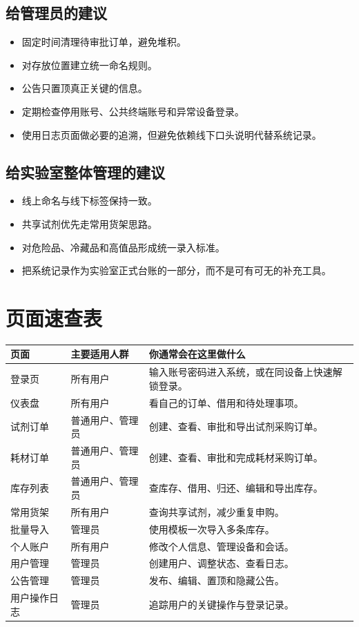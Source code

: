 \documentclass[12pt,a4paper]{ctexart}
\begin{document}
\subsection{给管理员的建议}
\begin{itemize}
  \item 固定时间清理待审批订单，避免堆积。
  \item 对存放位置建立统一命名规则。
  \item 公告只置顶真正关键的信息。
  \item 定期检查停用账号、公共终端账号和异常设备登录。
  \item 使用日志页面做必要的追溯，但避免依赖线下口头说明代替系统记录。
\end{itemize}

\subsection{给实验室整体管理的建议}
\begin{itemize}
  \item 线上命名与线下标签保持一致。
  \item 共享试剂优先走常用货架思路。
  \item 对危险品、冷藏品和高值品形成统一录入标准。
  \item 把系统记录作为实验室正式台账的一部分，而不是可有可无的补充工具。
\end{itemize}

\newpage
\section{页面速查表}

\begin{longtable}{p{3cm} p{4cm} p{7cm}}
\toprule
页面 & 主要适用人群 & 你通常会在这里做什么 \\
\midrule
登录页 & 所有用户 & 输入账号密码进入系统，或在同设备上快速解锁登录。 \\
仪表盘 & 所有用户 & 看自己的订单、借用和待处理事项。 \\
试剂订单 & 普通用户、管理员 & 创建、查看、审批和导出试剂采购订单。 \\
耗材订单 & 普通用户、管理员 & 创建、查看、审批和完成耗材采购订单。 \\
库存列表 & 普通用户、管理员 & 查库存、借用、归还、编辑和导出库存。 \\
常用货架 & 所有用户 & 查询共享试剂，减少重复申购。 \\
批量导入 & 管理员 & 使用模板一次导入多条库存。 \\
个人账户 & 所有用户 & 修改个人信息、管理设备和会话。 \\
用户管理 & 管理员 & 创建用户、调整状态、查看日志。 \\
公告管理 & 管理员 & 发布、编辑、置顶和隐藏公告。 \\
用户操作日志 & 管理员 & 追踪用户的关键操作与登录记录。 \\
\bottomrule
\end{longtable}
\end{document}
